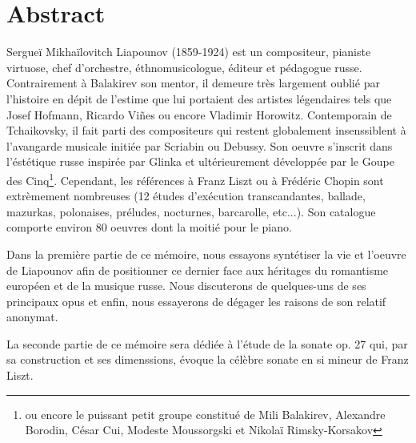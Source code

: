 
\chapter*{Abstract}

Sergueï Mikhaïlovitch Liapounov (1859-1924) est un compositeur, pianiste virtuose,
chef d'orchestre, éthnomusicologue, éditeur et pédagogue russe. Contrairement à
Balakirev son mentor, il demeure très largement oublié par l'histoire en dépit
de l'estime que lui portaient des artistes légendaires tels que Josef Hofmann,
Ricardo Vi\~{n}es ou encore Vladimir Horowitz.
Contemporain de Tchaikovsky, il fait parti des compositeurs qui restent globalement
insenssiblent à l'avangarde musicale initiée par Scriabin ou Debussy. Son oeuvre
s'inscrit dans l'éstétique russe inspirée par Glinka et ultérieurement développée
par le Goupe des Cinq\footnote{ou encore le puissant petit groupe constitué de Mili
Balakirev, Alexandre Borodin, César Cui, Modeste Moussorgski et Nikolaï
Rimsky-Korsakov}. Cependant, les références à Franz Liszt ou à Frédéric Chopin
sont extrèmement nombreuses (12 études d'exécution transcandantes, ballade,
mazurkas, polonaises, préludes, nocturnes, barcarolle, etc...). Son catalogue
comporte environ 80 oeuvres dont la moitié pour le piano.

Dans la première partie de ce mémoire, nous essayons syntétiser la vie et
l'oeuvre de Liapounov afin de positionner ce dernier face aux héritages du
romantisme européen et de la musique russe. Nous discuterons de quelques-uns
de ses principaux opus et enfin, nous essayerons de dégager les raisons de son
relatif anonymat.

La seconde partie de ce mémoire sera dédiée à l'étude de la sonate op. 27 qui,
par sa construction et ses dimenssions, évoque la célèbre sonate en si mineur
de Franz Liszt.

